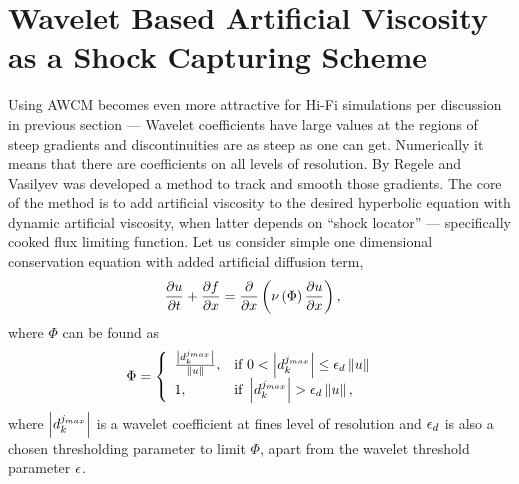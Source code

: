 \section{Wavelet Based Artificial Viscosity as a Shock Capturing Scheme}
Using AWCM becomes even more attractive for Hi-Fi simulations per discussion in previous section --- Wavelet coefficients have large values at the regions of steep gradients and discontinuities are as steep as one can get. Numerically it means that there are coefficients on all levels of resolution. By Regele and Vasilyev \cite{lib:RegVas} was developed a method to track and smooth those gradients. The core of the method is to add artificial viscosity to the desired hyperbolic equation with dynamic artificial viscosity, when latter depends on ``shock locator'' --- specifically cooked flux limiting function. Let us consider simple one dimensional conservation equation with added artificial diffusion term,
\begin{align}
\frac {\partial u}{\partial t} + \frac {\partial f}{\partial x} &= \frac {\partial} {\partial x} \left(\nu \left(\Phi\right) \frac {\partial u}{\partial x}\right),
\end{align}
where $\Phi$ can be found as
\begin{align}
\Phi &= \left\{\begin{array}{ll}
\frac {\left|d_k^{j_{max}}\right|}{\left\|u\right\|}, & \textmd{if } 0 < \left|d_k^{j_{max}}\right| \le \epsilon_d \left\|u\right\| \\
1, & \textmd{if } \left|d_k^{j_{max}}\right| > \epsilon_d \left\|u\right\|,
\end{array}\right.
\end{align}
where $\left|d_k^{j_{max}}\right|$ is a wavelet coefficient at fines level of resolution and $\epsilon_d$ is also a chosen thresholding parameter to limit $\Phi$, apart from the wavelet threshold parameter $\epsilon$.

